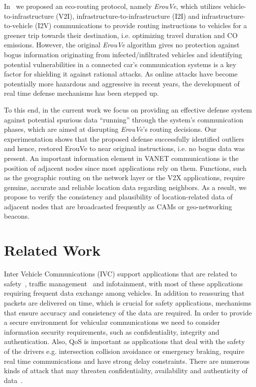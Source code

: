 \documentclass[conference]{IEEEtran}
\begin{document}
In~\cite{maglaras2013exploiting} we proposed an eco-routing protocol, namely {\it ErouVe}, which utilizes vehicle-to-infrastructure (V2I), infrastructure-to-infrastructure (I2I) and  infrastructure-to-vehicle (I2V) communications to provide routing instructions to vehicles for a greener trip towards their destination, i.e. optimizing travel duration and CO emissions. However, the original {\it ErouVe} algorithm gives no protection against bogus information originating from infected/infiltrated vehicles and 
identifying potential vulnerabilities in a connected car's communication systems is a key factor for shielding it against rational attacks. As online attacks have become potentially more hazardous and aggressive in recent years,
the development of real time defense mechanisms has been stepped up.



To this end, in the current work we focus on providing an effective defense system against
potential spurious data ``running'' through the system's communication phases, which are aimed at disrupting {\it ErouVe}'s routing decisions. Our experimentation shows
that the proposed defense successfully identified outliers and hence, restored ErouVe to near original instructions, i.e. no bogus data was present.
An important information element in VANET communications is the position of adjacent nodes since most applications rely on them. Functions, such as the geographic
routing on the network layer or the V2X applications, require genuine, accurate and reliable location data
regarding neighbors. As a result, we propose to verify the consistency and plausibility of location-related
data of adjacent nodes that are broadcasted frequently as CAMs or geo-networking beacons.



\section{Related Work}

Inter Vehicle Communications (IVC) support applications that are related to safety~\cite{biswas2006vehicle}, traffic management~\cite{milojevic2014distributed} and infotainment, with most of these applications requiring frequent data exchange among vehicles. In addition to reassuring that packets are delivered on
time, which is crucial for safety applications, mechanisms that ensure accuracy and consistency of the data are required. In order to 
provide a secure environment for vehicular communications we need to consider information security requirements, such as confidentiality, integrity and authentication. Also, QoS is important as applications that deal with the safety of the drivers e.g. intersection collision avoidance or emergency braking, require real time communications and have strong delay constraints. 
There are numerous kinds of attack that may threaten confidentiality, availability and authenticity of data~\cite{maglaras2015}.
\end{document}
